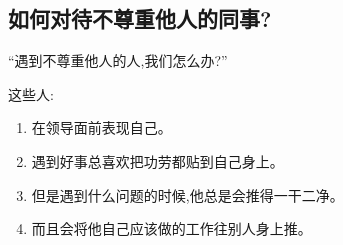 \documentclass[11pt]{article}
\begin{document}
\subsection{如何对待不尊重他人的同事?}\label{link4}

\begin{myquote}
``遇到不尊重他人的人,我们怎么办?''

这些人:
\begin{enumerate}
  \item 在领导面前表现自己。
  \item 遇到好事总喜欢把功劳都贴到自己身上。
  \item 但是遇到什么问题的时候,他总是会推得一干二净。
  \item 而且会将他自己应该做的工作往别人身上推。
\end{enumerate}
\end{myquote}

\begin{comment}
这些都是非常不专业的行为。他们可能会一时成功,但是他们的成功不会是太长远的。这就是
专业态度是可持续的成功,否则是可能成功,但未必是可持续的。

我肯定不会鼓励你如他们一样,变得不专业。我的提议是:

1)学会表达你自己。你自己做的任务,要有报告的习惯。每周,写一个简单的报告,主动提交给领导。这样,你就
保护了你自己的努力。也不用争功,也不是拍马屁。只是老老实实、简简单单地作报告。报告要能抓重点。这个就
是一个磨练。要磨练,就是要写了报告之后,自己回答这些问题: ``这个报告精简么?'' ``这个报告里,有哪些是
可以不说的?'' 好的报告包括:过去的实施如何对比计划的。将来的计划是什么?有什么风险?如果你能够做到这一
点,任务的功劳,人家是抢不了的。这是保护自己。当然,不是每一件事都能保护。我自己也是被人抢了功劳。这
些情形,我们只能让人家知道你是有自我保护意识的,来让他们知难而退而已。只能这样。

2)要看开一点。``本来无一物,何处染尘埃?''人家的不良习惯,我们不需要太关心人家是否邀功。就算不是他的
权利(因为这样不专业),他也有这个自由。让他们找他们的道路。有机会,恰当的时候可以谈一下,否则自己关
注把事情做好就是了。

3)要保护自己。要学会拒绝过分的任务。这个很容易,你要练习说一些礼貌地拒绝的话。比如:``这个你做更适
合。'' ``这个你更有能力做的好。'',甚至简单地,``我很忙,对不起。''其中有一个方法,老外叫做``broken
record'',就像一个破唱片一样,不断地重复同一小段的句子。无论人家说什么,你就是安安静静地一句``我知道
你要我做这个。但是我很忙,对不起。''或是``我很忙,这次不能帮你。这个你更有能力做的更好。''不要轻视这
个。我自己就是这样锻炼自己的。很有效果。

我不赞同说:``对不起,我很忙,你找(另一位同事)吧!''因为这个是你与他之间的事,不要把问题无必要地扩
大,让其他的人受干扰。如果你拒绝了人家,他自己去找其他的人,是他的责任。如果你提议人家找某某人,是你
把某某人拉到水里去。这个你不应该做。

如果再有问题,请给我邮件。

谢谢你的参与、兴趣和努力。
\end{comment}
\end{document}
